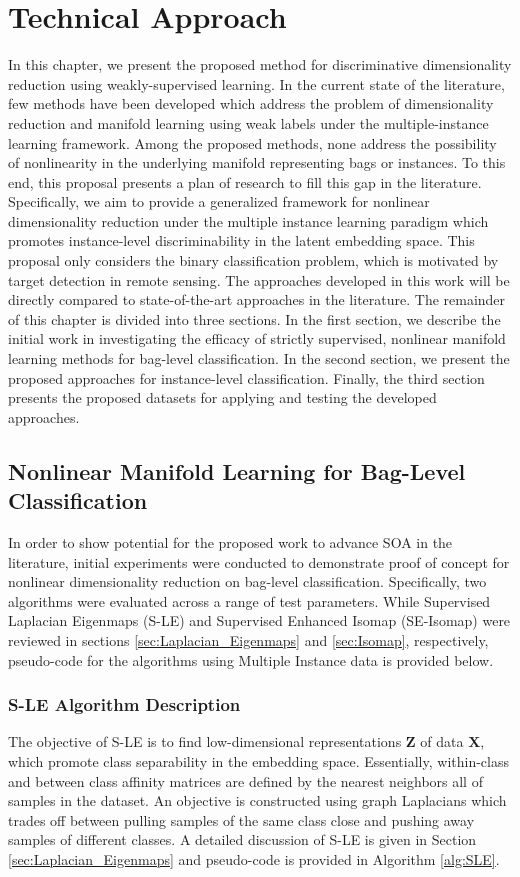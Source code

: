 \chapter{Technical Approach}
In this chapter, we present the proposed method for discriminative dimensionality reduction using weakly-supervised learning. In the current state of the literature, few methods have been developed which address the problem of dimensionality reduction and manifold learning using weak labels under the multiple-instance learning framework.  Among the proposed methods, none address the possibility of nonlinearity in the underlying manifold representing bags or instances. To this end, this proposal presents a plan of research to fill this gap in the literature.  Specifically, we aim to provide a generalized framework for nonlinear dimensionality reduction under the multiple instance learning paradigm which promotes instance-level discriminability in the latent embedding space.  This proposal only considers the binary classification problem, which is motivated by target detection in remote  sensing. The approaches developed in this work will be directly compared to state-of-the-art approaches in the literature.  The remainder of this chapter is divided into three sections.  In the first section, we describe the initial work in investigating the efficacy of strictly supervised, nonlinear manifold learning methods for bag-level classification.  In the second section, we present the proposed approaches for instance-level classification.  Finally, the third section presents the proposed datasets for applying and testing the developed approaches. 

\section{Nonlinear Manifold Learning for Bag-Level Classification}
In order to show potential for the proposed work to advance SOA in the literature, initial experiments were conducted to demonstrate proof of concept for nonlinear dimensionality reduction on bag-level classification.  Specifically, two algorithms were evaluated across a range of test parameters.  While Supervised Laplacian Eigenmaps (S-LE) and Supervised Enhanced Isomap (SE-Isomap) were reviewed in sections \ref{sec:Laplacian_Eigenmaps} and \ref{sec:Isomap}, respectively, pseudo-code for the algorithms using Multiple Instance data is provided below.  

\subsection{S-LE Algorithm Description}
The objective of S-LE \citep{Raducanu2012SupervisedNonlinearDimReduction} is to find low-dimensional representations $\bm{Z}$ of data $\bm{X}$, which promote class separability in the embedding space.  Essentially, within-class and between class affinity matrices are defined by the nearest neighbors all of samples in the dataset.  An objective is constructed using graph Laplacians  which trades off between pulling samples of the same class close and pushing away samples of different classes.   A detailed discussion of S-LE is given in Section \ref{sec:Laplacian_Eigenmaps} and pseudo-code is provided in Algorithm \ref{alg:SLE}.

